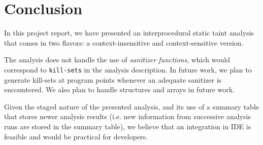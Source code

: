 \section{Conclusion}\label{sec:conclusion}

In this project report, we have presented an interprocedural
static taint analysis that comes in two flavors: a
context-insensitive and context-sensitive version.

The analysis does not handle the use of
\textit{sanitizer functions}, which would correspond
to \texttt{kill-sets} in the analysis description.
In future work, we plan to generate kill-sets at
program points whenever an adequate sanitizer is
encountered.
We also plan to handle structures and arrays in future work.

Given the staged nature of the presented analysis, and its
use of a summary table that stores newer analysis results
(i.e. new information from successive analysis runs are stored
in the summary table), we believe that an integration in IDE
is feasible and would be practical for developers.
